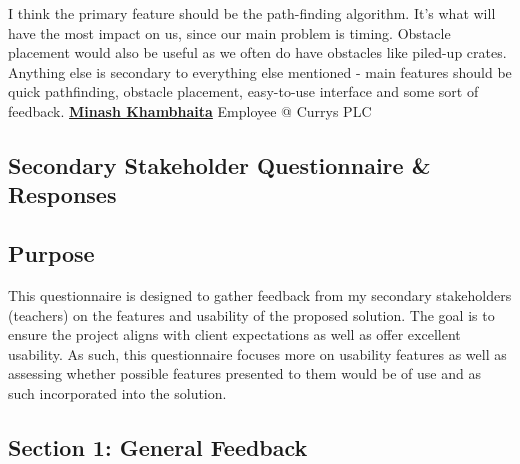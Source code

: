 I think the primary feature should be the path-finding algorithm. It's what will have the most impact on us, since our main problem is timing. Obstacle placement would also be useful as we often do have obstacles like piled-up crates. Anything else is secondary to everything else mentioned - main features should be quick pathfinding, obstacle placement, easy-to-use interface and some sort of feedback.
\vspace{2cm}
\newline
\textbf{\underline{Minash Khambhaita}} \newline
Employee @ Currys PLC

\newpage
\subsection{Secondary Stakeholder Questionnaire \& Responses}

\subsection*{Purpose}
This questionnaire is designed to gather feedback from my secondary stakeholders (teachers) on the features and usability of the proposed solution. The goal is to ensure the project aligns with client expectations as well as offer excellent usability. As such, this questionnaire focuses more on usability features as well as assessing whether possible features presented to them would be of use and as such incorporated into the solution.

\subsection*{Section 1: General Feedback}

